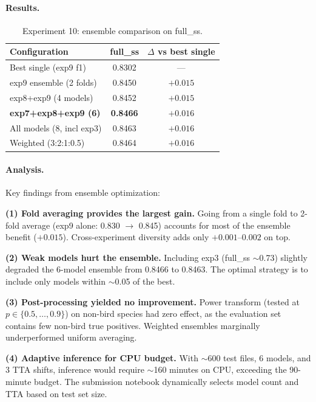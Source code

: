 \paragraph{Results.}

\begin{table}[h]
\centering
\caption{Experiment 10: ensemble comparison on full\_ss.}
\label{tab:exp10}
\begin{tabular}{lcc}
\hline
\textbf{Configuration} & \textbf{full\_ss} & \textbf{$\Delta$ vs best single} \\
\hline
Best single (exp9 f1)        & 0.8302 & --- \\
exp9 ensemble (2 folds)      & 0.8450 & $+0.015$ \\
exp8+exp9 (4 models)         & 0.8452 & $+0.015$ \\
\textbf{exp7+exp8+exp9 (6)}  & \textbf{0.8466} & $+\mathbf{0.016}$ \\
All models (8, incl exp3)    & 0.8463 & $+0.016$ \\
Weighted (3:2:1:0.5)         & 0.8464 & $+0.016$ \\
\hline
\end{tabular}
\end{table}

\paragraph{Analysis.}
Key findings from ensemble optimization:

\textbf{(1) Fold averaging provides the largest gain.}
Going from a single fold to 2-fold average (exp9 alone: 0.830 $\to$ 0.845)
accounts for most of the ensemble benefit ($+0.015$). Cross-experiment
diversity adds only $+0.001$--$0.002$ on top.

\textbf{(2) Weak models hurt the ensemble.}
Including exp3 (full\_ss $\sim$0.73) slightly degraded the 6-model ensemble
from 0.8466 to 0.8463. The optimal strategy is to include only models within
$\sim$0.05 of the best.

\textbf{(3) Post-processing yielded no improvement.}
Power transform (tested at $p \in \{0.5, \ldots, 0.9\}$) on non-bird species
had zero effect, as the evaluation set contains few non-bird true positives.
Weighted ensembles marginally underperformed uniform averaging.

\textbf{(4) Adaptive inference for CPU budget.}
With $\sim$600 test files, 6 models, and 3 TTA shifts, inference would require
$\sim$160 minutes on CPU, exceeding the 90-minute budget. The submission
notebook dynamically selects model count and TTA based on test set size.

